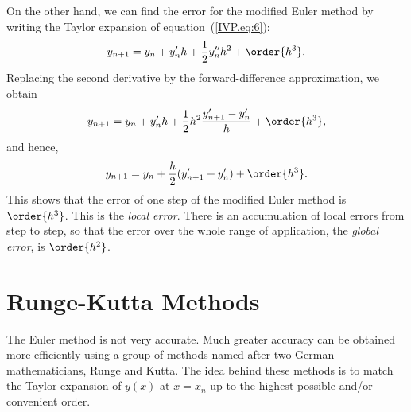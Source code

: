 On the other hand, we can find the error for the modified Euler method by
writing the Taylor expansion of equation~(\ref{IVP.eq:6}):
%
\begin{equation}
  y_{n+1} = y_n + y'_n h+ \frac{1}{2} y''_n h^2 + \order{h^3}.
  \label{IVP.eq:11}
\end{equation}
%
Replacing the second derivative by the forward-difference
approximation, we obtain
%
\begin{equation}
  y_{n+1} = y_n + y'_n h + \frac{1}{2} h^2 \frac{y'_{n+1}-y'_n}{h} + \order{h^3},
  \label{IVP.eq:12}
\end{equation}
%
and hence,
%
\begin{equation}
  y_{n+1} = y_n + \frac{h}{2}(y'_{n+1}+y'_n) + \order{h^3}.
  \label{IVP.eq:13}
\end{equation}
%
This shows that the error of one step of the modified Euler method is
$\order{h^3}$. This is the \textit{local error}. There is an accumulation
of local errors from step to step, so that the error over the whole
range of application, the \textit{global error}, is $\order{h^2}$.

\section{Runge-Kutta Methods}

The Euler method is not very accurate. Much greater accuracy can be
obtained more efficiently using a group of methods named after two
German mathematicians, Runge and Kutta.  The idea behind these methods
is to match the Taylor expansion of $y(x)$ at $x=x_n$ up to the
highest possible and/or convenient order.

